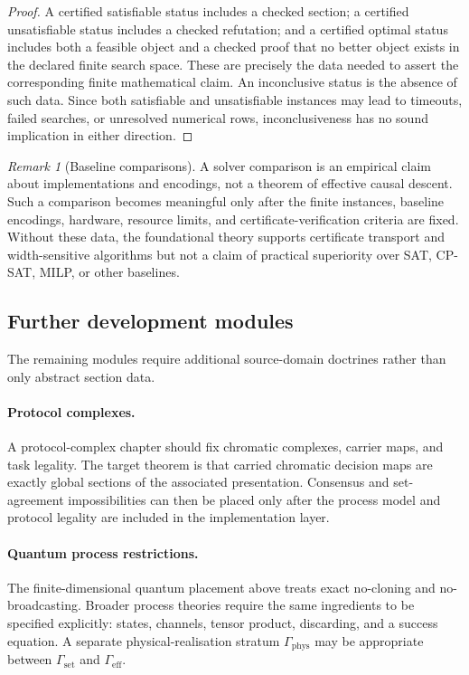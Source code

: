 \documentclass[11pt]{article}
\theoremstyle{plain}
\theoremstyle{definition}
\theoremstyle{remark}
\newtheorem{remark}[theorem]{Remark}
\begin{document}
\begin{proof}
A certified satisfiable status includes a checked section; a certified
unsatisfiable status includes a checked refutation; and a certified optimal
status includes both a feasible object and a checked proof that no better object
exists in the declared finite search space. These are precisely the data needed
to assert the corresponding finite mathematical claim. An inconclusive status is
the absence of such data. Since both satisfiable and unsatisfiable instances may
lead to timeouts, failed searches, or unresolved numerical rows, inconclusiveness
has no sound implication in either direction.
\end{proof}

\begin{remark}[Baseline comparisons]
A solver comparison is an empirical claim about implementations and encodings,
not a theorem of effective causal descent. Such a comparison becomes meaningful
only after the finite instances, baseline encodings, hardware, resource limits,
and certificate-verification criteria are fixed. Without these data, the
foundational theory supports certificate transport and width-sensitive algorithms
but not a claim of practical superiority over SAT, CP-SAT, MILP, or other
baselines.
\end{remark}

\subsection{Further development modules}

The remaining modules require additional source-domain doctrines rather than only
abstract section data.

\paragraph{Protocol complexes.}
A protocol-complex chapter should fix chromatic complexes, carrier maps, and task
legality. The target theorem is that carried chromatic decision maps are exactly
global sections of the associated presentation. Consensus and set-agreement
impossibilities can then be placed only after the process model and protocol
legality are included in the implementation layer.

\paragraph{Quantum process restrictions.}
The finite-dimensional quantum placement above treats exact no-cloning and
no-broadcasting. Broader process theories require the same ingredients to be
specified explicitly: states, channels, tensor product, discarding, and a success
equation. A separate physical-realisation stratum
$\Gamma_{\mathrm{phys}}$ may be appropriate between $\Gamma_{\mathrm{set}}$ and
$\Gamma_{\mathrm{eff}}$.
\end{document}
